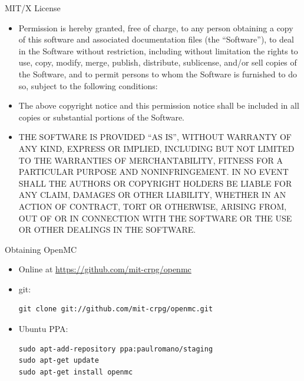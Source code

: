 \documentclass[serif]{beamer}
\begin{document}

\begin{frame}{MIT/X License}
  \footnotesize{
  \begin{itemize}
  \item<1-> Permission is hereby granted, free of charge, to any person
    obtaining a copy of this software and associated documentation files (the
    “Software”), to deal in the Software without restriction, including
    without limitation the rights to use, copy, modify, merge, publish,
    distribute, sublicense, and/or sell copies of the Software, and to permit
    persons to whom the Software is furnished to do so, subject to the following
    conditions:
  \item<1-> The above copyright notice and this permission notice shall be
    included in all copies or substantial portions of the Software.
  \item<1-> THE SOFTWARE IS PROVIDED “AS IS”, WITHOUT WARRANTY OF ANY KIND,
    EXPRESS OR IMPLIED, INCLUDING BUT NOT LIMITED TO THE WARRANTIES OF
    MERCHANTABILITY, FITNESS FOR A PARTICULAR PURPOSE AND NONINFRINGEMENT. IN NO
    EVENT SHALL THE AUTHORS OR COPYRIGHT HOLDERS BE LIABLE FOR ANY CLAIM,
    DAMAGES OR OTHER LIABILITY, WHETHER IN AN ACTION OF CONTRACT, TORT OR
    OTHERWISE, ARISING FROM, OUT OF OR IN CONNECTION WITH THE SOFTWARE OR THE
    USE OR OTHER DEALINGS IN THE SOFTWARE.
  \end{itemize}
  }
\end{frame}


\begin{frame}[fragile]{Obtaining OpenMC}
  \begin{itemize}
  \vfill
  \item<1-> Online at \url{https://github.com/mit-crpg/openmc}
  \vfill
  \item<1-> git:
\begin{lstlisting}
git clone git://github.com/mit-crpg/openmc.git
\end{lstlisting}
  \vfill
  \item<1-> Ubuntu PPA:
\begin{lstlisting}
sudo apt-add-repository ppa:paulromano/staging
sudo apt-get update
sudo apt-get install openmc
\end{lstlisting}
  \vfill
  \end{itemize}
\end{frame}
\end{document}
